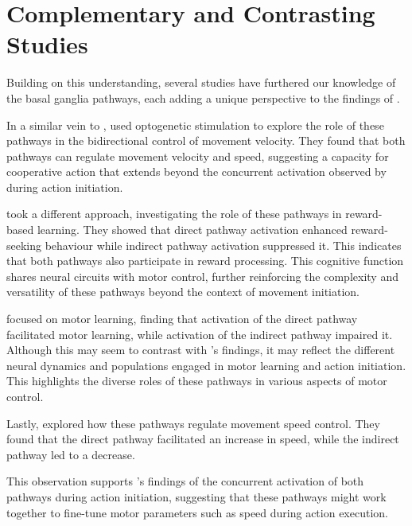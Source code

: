 \documentclass[10pt]{article}
\begin{document}
\begin{sloppypar}
  \section{Complementary and Contrasting Studies}
  \label{sec:complementary-and-contrasting-studies}

  Building on this understanding, several studies have furthered our knowledge of the basal ganglia pathways, each adding a unique perspective to the findings of \cite{cui_concurrent_2013}.

  In a similar vein to \citeauthor{cui_concurrent_2013}, \cite{yttri_opponent_2016} used optogenetic stimulation to explore the role of these pathways in the bidirectional control of movement velocity. They found that both pathways can regulate movement velocity and speed, suggesting a capacity for cooperative action that extends beyond the concurrent activation observed by \citeauthor{cui_concurrent_2013} during action initiation.

  \cite{guillaumin_experimental_2021} took a different approach, investigating the role of these pathways in reward-based learning. They showed that direct pathway activation enhanced reward-seeking behaviour while indirect pathway activation suppressed it. This indicates that both pathways also participate in reward processing. This cognitive function shares neural circuits with motor control, further reinforcing the complexity and versatility of these pathways beyond the context of movement initiation.

  \cite{hilt_evidence_2016} focused on motor learning, finding that activation of the direct pathway facilitated motor learning, while activation of the indirect pathway impaired it. Although this may seem to contrast with \cite{cui_concurrent_2013}’s findings, it may reflect the different neural dynamics and populations engaged in motor learning and action initiation. This highlights the diverse roles of these pathways in various aspects of motor control.

  Lastly, \cite{wang_direct_2015} explored how these pathways regulate movement speed control. They found that the direct pathway facilitated an increase in speed, while the indirect pathway led to a decrease.

  \newpage

  This observation supports \cite{cui_concurrent_2013}’s findings of the concurrent activation of both pathways during action initiation, suggesting that these pathways might work together to fine-tune motor parameters such as speed during action execution.


\end{sloppypar}
\end{document}
